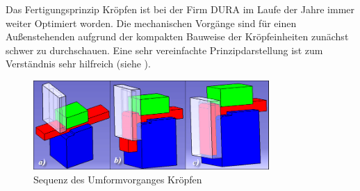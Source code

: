 \documentclass[12pt,a4paper,parskip,twoside,BCOR5mm,headsepline]{scrartcl}
\begin{document}
\begin{description*}
Das Fertigungsprinzip Kröpfen  ist bei der Firm DURA im  Laufe der Jahre immer weiter Optimiert worden. Die mechanischen Vorgänge sind für einen Außenstehenden aufgrund der kompakten Bauweise der Kröpfeinheiten zunächst schwer zu durchschauen. Eine sehr vereinfachte Prinzipdarstellung ist zum Verständnis sehr hilfreich (siehe ).\\
\begin{figure}[hbtp]
\centering
\includegraphics[width=0.8\textwidth]{krpfsequenz}
\caption{Sequenz des Umformvorganges Kröpfen}
\label{fig:krpfprinz}
\end{figure}






\end{description*}
\end{document}
